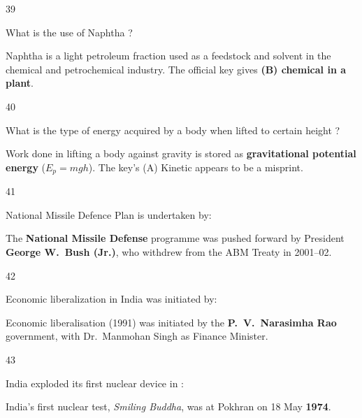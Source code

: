 \begin{question}{39}
{What is the use of Naphtha ?\par}
\begin{explain}
Naphtha is a light petroleum fraction used as a feedstock and solvent in the chemical and petrochemical industry. The official key gives \textbf{(B) chemical in a plant}.
\end{explain}
\end{question}

\begin{question}{40}
{What is the type of energy acquired by a body when lifted to certain height ?\par}
\begin{explain}
Work done in lifting a body against gravity is stored as \textbf{gravitational potential energy} ($E_p=mgh$). The key's (A) Kinetic appears to be a misprint.
\end{explain}
\end{question}

\begin{question}{41}
{National Missile Defence Plan is undertaken by:\par}
\begin{explain}
The \textbf{National Missile Defense} programme was pushed forward by President \textbf{George W.~Bush (Jr.)}, who withdrew from the ABM Treaty in 2001--02.
\end{explain}
\end{question}

\begin{question}{42}
{Economic liberalization in India was initiated by:\par}
\begin{explain}
Economic liberalisation (1991) was initiated by the \textbf{P.~V.~Narasimha Rao} government, with Dr.~Manmohan Singh as Finance Minister.
\end{explain}
\end{question}

\begin{question}{43}
{India exploded its first nuclear device in :\par}
\begin{explain}
India's first nuclear test, \emph{Smiling Buddha}, was at Pokhran on 18 May \textbf{1974}.
\end{explain}
\end{question}

